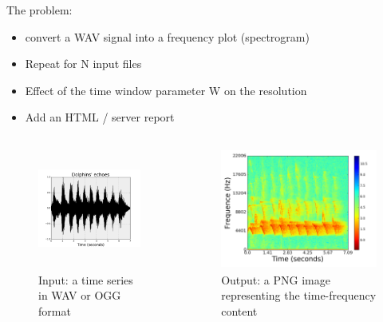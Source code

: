 \documentclass{beamer}
\begin{document}
\begin{frame}
\centering
The problem: 

\begin{itemize}
 \item convert a WAV signal into a frequency plot (spectrogram)
 \item Repeat for N input files
 \item Effect of the time window parameter W on the resolution
 \item Add an HTML / server report
\end{itemize}

\begin{columns}

\begin{column}{5cm}
\begin{figure}
\includegraphics[height=4cm, width=\textwidth]{images/dolphin_timeseries.png} 
\caption{Input: a time series in WAV or OGG format}
\end{figure}
\end{column}

\begin{column}{6cm}
\begin{figure}
\includegraphics[height=4cm, width=1\textwidth]{images/DOLPHINS_1024.png}
\caption{Output: a PNG image representing the time-frequency content}
\end{figure}
\end{column}

\end{columns}

\end{frame}
\end{document}
